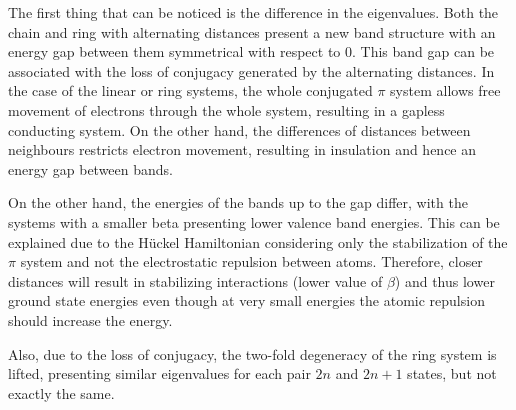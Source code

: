 \documentclass{article}
\begin{document}
The first thing that can be noticed is the difference in the eigenvalues. Both the chain and ring with alternating distances present a new band structure with an energy gap between them symmetrical with respect to $0$. This band gap can be associated with the loss of conjugacy generated by the alternating distances. In the case of the linear or ring systems, the whole conjugated $\pi$ system allows free movement of electrons through the whole system, resulting in a gapless conducting system. On the other hand, the differences of distances between neighbours restricts electron movement, resulting in insulation and hence an energy gap between bands. 

On the other hand, the energies of the bands up to the gap differ, with the systems with a smaller beta presenting lower valence band energies. This can be explained due to the Hückel Hamiltonian considering only the stabilization of the $\pi$ system and not the electrostatic repulsion between atoms. Therefore, closer distances will result in stabilizing interactions (lower value of $\beta$) and thus lower ground state energies even though at very small energies the atomic repulsion should increase the energy. 

Also, due to the loss of conjugacy, the two-fold degeneracy of the ring system is lifted, presenting similar eigenvalues for each pair $2n$ and $2n+1$ states, but not exactly the same.
\end{document}
